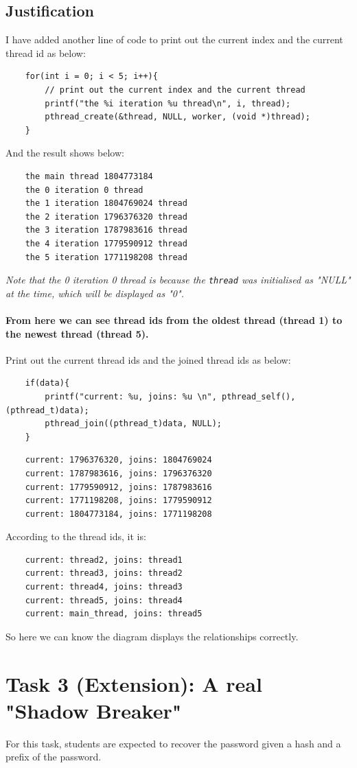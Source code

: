 \documentclass{article}
\begin{document}
\subsection{Justification}
I have added another line of code to print out the current index and the current thread id as below: 
\begin{lstlisting}
	for(int i = 0; i < 5; i++){
        // print out the current index and the current thread
        printf("the %i iteration %u thread\n", i, thread);
        pthread_create(&thread, NULL, worker, (void *)thread);
    }
\end{lstlisting}
And the result shows below:
\begin{lstlisting}
	the main thread 1804773184 
	the 0 iteration 0 thread
	the 1 iteration 1804769024 thread
	the 2 iteration 1796376320 thread
	the 3 iteration 1787983616 thread
	the 4 iteration 1779590912 thread
	the 5 iteration 1771198208 thread
\end{lstlisting}
\emph{Note that the 0 iteration 0 thread is because the \texttt{thread} was initialised as "NULL" at the time, which will be displayed as "0".}
\paragraph{From here we can see thread ids from the oldest thread (thread 1) to the newest thread (thread 5).} Print out the current thread ids and the joined thread ids as below:
\begin{lstlisting}
	if(data){
        printf("current: %u, joins: %u \n", pthread_self(), (pthread_t)data);
        pthread_join((pthread_t)data, NULL);
    }
\end{lstlisting}
\begin{lstlisting}
	current: 1796376320, joins: 1804769024 
	current: 1787983616, joins: 1796376320 
	current: 1779590912, joins: 1787983616 
	current: 1771198208, joins: 1779590912 
	current: 1804773184, joins: 1771198208
\end{lstlisting}
According to the thread ids, it is:  
\begin{lstlisting}
	current: thread2, joins: thread1 
	current: thread3, joins: thread2 
	current: thread4, joins: thread3 
	current: thread5, joins: thread4
	current: main_thread, joins: thread5
\end{lstlisting}
So here we can know the diagram displays the relationships correctly.

\section{Task 3 (Extension): A real "Shadow Breaker"}
For this task, students are expected to recover the password given a hash and a prefix of the password. 
\end{document}
